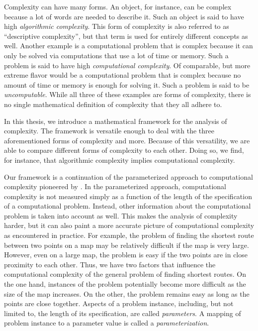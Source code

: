 \abstract
Complexity can have many forms.
An object, for instance, can be complex because a lot of words are needed to describe it.
Such an object is said to have high \emph{algorithmic complexity}.
This form of complexity is also referred to as \enquote{descriptive complexity}, but that term is used for entirely different concepts as well.
Another example is a computational problem that is complex because it can only be solved via computations that use a lot of time or memory.
Such a problem is said to have high \emph{computational complexity}.
Of comparable, but more extreme flavor would be a computational problem that is complex because no amount of time or memory is enough for solving it.
Such a problem is said to be \emph{uncomputable}.
While all three of these examples are forms of complexity, there is no single mathematical definition of complexity that they all adhere to.

In this thesis, we introduce a mathematical framework for the analysis of complexity.
The framework is versatile enough to deal with the three aforementioned forms of complexity and more.
Because of this versatility, we are able to compare different forms of complexity to each other.
Doing so, we find, for instance, that algorithmic complexity implies computational complexity.

Our framework is a continuation of the parameterized approach to computational complexity pioneered by \citeauthor{downey1999parameterized}.
In the parameterized approach, computational complexity is not measured simply as a function of the length of the specification of a computational problem.
Instead, other information about the computational problem is taken into account as well.
This makes the analysis of complexity harder, but it can also paint a more accurate picture of computational complexity as encountered in practice.
For example, the problem of finding the shortest route between two points on a map may be relatively difficult if the map is very large.
However, even on a large map, the problem is easy if the two points are in close proximity to each other.
Thus, we have two factors that influence the computational complexity of the general problem of finding shortest routes.
On the one hand, instances of the problem potentially become more difficult as the size of the map increases.
On the other, the problem remains easy as long as the points are close together.
Aspects of a problem instance, including, but not limited to, the length of its specification, are called \emph{parameters}.
A mapping of problem instance to a parameter value is called a \emph{parameterization}.

